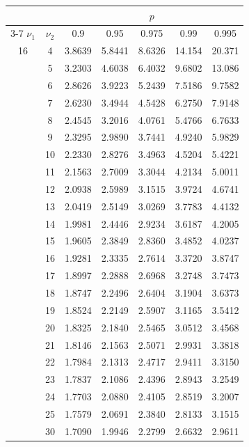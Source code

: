 \newpage
\noindent
\begin{minipage}{0.49\textwidth}
	\begin{center}
		\begin{tabular}{ccccccc}
			& & \multicolumn{5}{c}{$p$}\\
			\cline{3-7}
			$\nu_1$ & $\nu_2$ & 0.9 & 0.95 & 0.975 & 0.99 & 0.995 \\
			\midrule
			16 & 4 & 3.8639 & 5.8441 & 8.6326 & 14.154 & 20.371 \\
			& 5 & 3.2303 & 4.6038 & 6.4032 & 9.6802 & 13.086 \\
			& 6 & 2.8626 & 3.9223 & 5.2439 & 7.5186 & 9.7582 \\
			& 7 & 2.6230 & 3.4944 & 4.5428 & 6.2750 & 7.9148 \\
			& 8 & 2.4545 & 3.2016 & 4.0761 & 5.4766 & 6.7633 \\
			& 9 & 2.3295 & 2.9890 & 3.7441 & 4.9240 & 5.9829 \\[5pt]
			& 10 & 2.2330 & 2.8276 & 3.4963 & 4.5204 & 5.4221 \\
			& 11 & 2.1563 & 2.7009 & 3.3044 & 4.2134 & 5.0011 \\
			& 12 & 2.0938 & 2.5989 & 3.1515 & 3.9724 & 4.6741 \\
			& 13 & 2.0419 & 2.5149 & 3.0269 & 3.7783 & 4.4132 \\
			& 14 & 1.9981 & 2.4446 & 2.9234 & 3.6187 & 4.2005 \\
			& 15 & 1.9605 & 2.3849 & 2.8360 & 3.4852 & 4.0237 \\
			& 16 & 1.9281 & 2.3335 & 2.7614 & 3.3720 & 3.8747 \\
			& 17 & 1.8997 & 2.2888 & 2.6968 & 3.2748 & 3.7473 \\
			& 18 & 1.8747 & 2.2496 & 2.6404 & 3.1904 & 3.6373 \\
			& 19 & 1.8524 & 2.2149 & 2.5907 & 3.1165 & 3.5412 \\[5pt]
			& 20 & 1.8325 & 2.1840 & 2.5465 & 3.0512 & 3.4568 \\
			& 21 & 1.8146 & 2.1563 & 2.5071 & 2.9931 & 3.3818 \\
			& 22 & 1.7984 & 2.1313 & 2.4717 & 2.9411 & 3.3150 \\
			& 23 & 1.7837 & 2.1086 & 2.4396 & 2.8943 & 3.2549 \\
			& 24 & 1.7703 & 2.0880 & 2.4105 & 2.8519 & 3.2007 \\
			& 25 & 1.7579 & 2.0691 & 2.3840 & 2.8133 & 3.1515 \\
			& 30 & 1.7090 & 1.9946 & 2.2799 & 2.6632 & 2.9611 \\

\end{tabular}
\end{center}
\end{minipage}

